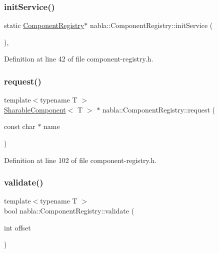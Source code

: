 \subsubsection{\texorpdfstring{initService()}{initService()}}
{\footnotesize\ttfamily static \mbox{\hyperlink{classnabla_1_1_component_registry}{Component\+Registry}}$\ast$ nabla\+::\+Component\+Registry\+::init\+Service (\begin{DoxyParamCaption}{ }\end{DoxyParamCaption})\hspace{0.3cm}{\ttfamily [inline]}, {\ttfamily [static]}}



Definition at line 42 of file component-\/registry.\+h.

\mbox{\label{classnabla_1_1_component_registry_aa61c3930a419c090e7ed649dd87af063}} 
\subsubsection{\texorpdfstring{request()}{request()}}
{\footnotesize\ttfamily template$<$typename T $>$ \\
\mbox{\hyperlink{structnabla_1_1_sharable_component}{Sharable\+Component}}$<$ T $>$ $\ast$ nabla\+::\+Component\+Registry\+::request (\begin{DoxyParamCaption}\item[{const char $\ast$}]{name }\end{DoxyParamCaption})}



Definition at line 102 of file component-\/registry.\+h.

\mbox{\label{classnabla_1_1_component_registry_a192ab752b97fe4b9be910645b2167a3e}} 
\subsubsection{\texorpdfstring{validate()}{validate()}}
{\footnotesize\ttfamily template$<$typename T $>$ \\
bool nabla\+::\+Component\+Registry\+::validate (\begin{DoxyParamCaption}\item[{int}]{offset }\end{DoxyParamCaption})}



